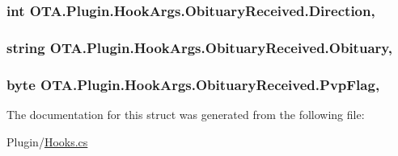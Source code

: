 \subsubsection[{Direction}]{\setlength{\rightskip}{0pt plus 5cm}int O\+T\+A.\+Plugin.\+Hook\+Args.\+Obituary\+Received.\+Direction\hspace{0.3cm}{\ttfamily [get]}, {\ttfamily [set]}}\label{struct_o_t_a_1_1_plugin_1_1_hook_args_1_1_obituary_received_ae09ab07427be3dc53726c021875c7bc9}
\hypertarget{struct_o_t_a_1_1_plugin_1_1_hook_args_1_1_obituary_received_af26ebfbfed5c412c6cf754f10ae35fa1}{}
\subsubsection[{Obituary}]{\setlength{\rightskip}{0pt plus 5cm}string O\+T\+A.\+Plugin.\+Hook\+Args.\+Obituary\+Received.\+Obituary\hspace{0.3cm}{\ttfamily [get]}, {\ttfamily [set]}}\label{struct_o_t_a_1_1_plugin_1_1_hook_args_1_1_obituary_received_af26ebfbfed5c412c6cf754f10ae35fa1}
\hypertarget{struct_o_t_a_1_1_plugin_1_1_hook_args_1_1_obituary_received_a5982ac63b8fed77e7d159932a68de8b2}{}
\subsubsection[{Pvp\+Flag}]{\setlength{\rightskip}{0pt plus 5cm}byte O\+T\+A.\+Plugin.\+Hook\+Args.\+Obituary\+Received.\+Pvp\+Flag\hspace{0.3cm}{\ttfamily [get]}, {\ttfamily [set]}}\label{struct_o_t_a_1_1_plugin_1_1_hook_args_1_1_obituary_received_a5982ac63b8fed77e7d159932a68de8b2}


The documentation for this struct was generated from the following file\+:\begin{DoxyCompactItemize}
\item 
Plugin/\hyperlink{_hooks_8cs}{Hooks.\+cs}\end{DoxyCompactItemize}
